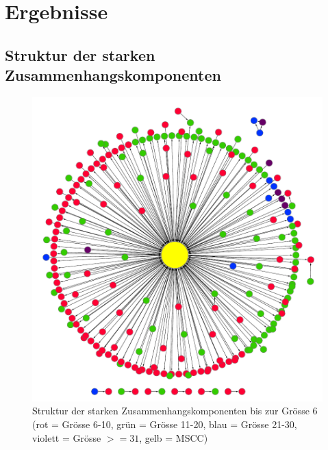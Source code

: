 
\chapter{Ergebnisse}
\label{ch:Ergebnisse}

\section{Struktur der starken Zusammenhangskomponenten}
\label{sec:struktur-der-starken}

\begin{figure}[h]
  \centering
  \includegraphics[scale=1.0]{images/metagraph-8.pdf}
  \caption{Struktur der starken Zusammenhangskomponenten bis zur
    Grösse 6 (rot = Grösse 6-10, grün = Grösse 11-20, blau = Grösse
    21-30, violett = Grösse $>= 31$, gelb = MSCC)}
  \label{fig:komponenten-struktur}
\end{figure}


